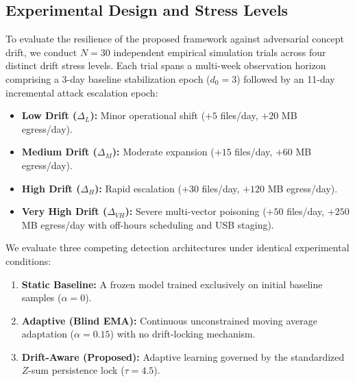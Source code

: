 \documentclass[conference]{IEEEtran}
\begin{document}
\subsection{Experimental Design and Stress Levels}
To evaluate the resilience of the proposed framework against adversarial concept drift, we conduct $N = 30$ independent empirical simulation trials across four distinct drift stress levels. Each trial spans a multi-week observation horizon comprising a 3-day baseline stabilization epoch ($d_0 = 3$) followed by an 11-day incremental attack escalation epoch:
\begin{itemize}
    \item \textbf{Low Drift ($\Delta_L$):} Minor operational shift ($+5$ files/day, $+20$ MB egress/day).
    \item \textbf{Medium Drift ($\Delta_M$):} Moderate expansion ($+15$ files/day, $+60$ MB egress/day).
    \item \textbf{High Drift ($\Delta_H$):} Rapid escalation ($+30$ files/day, $+120$ MB egress/day).
    \item \textbf{Very High Drift ($\Delta_{VH}$):} Severe multi-vector poisoning ($+50$ files/day, $+250$ MB egress/day with off-hours scheduling and USB staging).
\end{itemize}

We evaluate three competing detection architectures under identical experimental conditions:
\begin{enumerate}
    \item \textbf{Static Baseline:} A frozen model trained exclusively on initial baseline samples ($\alpha = 0$).
    \item \textbf{Adaptive (Blind EMA):} Continuous unconstrained moving average adaptation ($\alpha = 0.15$) with no drift-locking mechanism.
    \item \textbf{Drift-Aware (Proposed):} Adaptive learning governed by the standardized $Z$-sum persistence lock ($\tau = 4.5$).
\end{enumerate}
\end{document}
